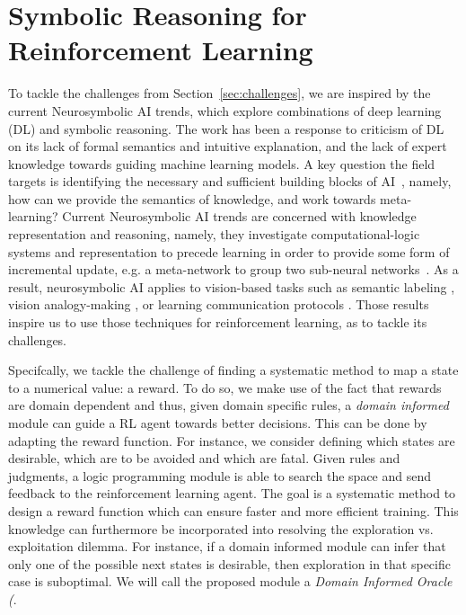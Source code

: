 \section{Symbolic Reasoning for Reinforcement Learning} 
\label{symrl}

To tackle the challenges from Section~\ref{sec:challenges}, we are
inspired by the current Neurosymbolic AI trends, which explore
combinations of deep learning (DL) and symbolic reasoning.
%
The work has been a response to criticism of DL on its lack of formal
semantics and intuitive explanation, and the lack of expert knowledge
towards guiding machine learning models.
%
A key question the field targets is identifying the necessary and
sufficient building blocks of AI~\cite{garcez2020neurosymbolic},
namely, how can we provide the semantics of knowledge, and work
towards meta-learning? 
%
Current Neurosymbolic AI trends are concerned with knowledge representation and reasoning, namely, they investigate computational-logic systems 
and representation to precede learning in order to provide some form
of incremental update, e.g. a meta-network to group two sub-neural
networks~\cite{Besold2017NeuralSymbolicLA}.
As a result, neurosymbolic AI applies to vision-based tasks such as semantic labeling \cite{vinyals2015, karpathy2015}, 
vision analogy-making \cite{Reed2015DeepVA}, or learning communication
protocols \cite{Foerster2016LearningTC}.
Those results inspire us to use those techniques for reinforcement learning, as to tackle its challenges.

\medskip
Specifcally, we tackle the challenge of finding a systematic method to map a state to a numerical value: a reward. 
To do so, we make use of the fact that rewards are domain dependent and thus, given domain specific rules, a \emph{domain informed} module can guide a RL agent towards better decisions. This can be done by 
adapting the reward function. For instance, we consider defining which states are desirable, which are to be avoided and which are fatal. Given rules and judgments, a logic programming module 
is able to search the space and send feedback to the reinforcement learning agent. The goal is a systematic method to design a reward function which can ensure faster and more efficient 
training. This knowledge can furthermore be incorporated into resolving the exploration vs. exploitation dilemma. For instance, if a domain informed module 
can infer that only one of the possible next states is desirable, then exploration in that specific case is suboptimal.  
We will call the proposed module a \emph{Domain Informed Oracle
(\dio{}}.

